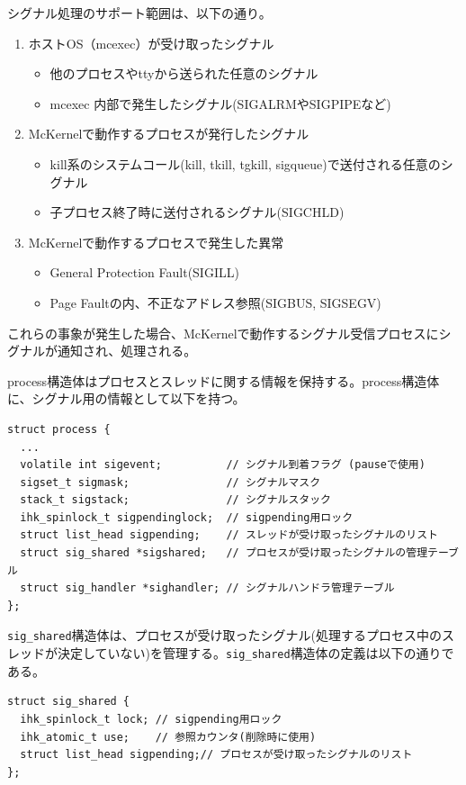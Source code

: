 \documentclass[twoside,11pt,fleqn]{book}
\newcounter{subsubsubsection}[subsubsection]
\begin{document}
{シグナル処理のサポート範囲は、以下の通り。
\begin{enumerate}
\item ホストOS（mcexec）が受け取ったシグナル
\begin{itemize}
\item 他のプロセスやttyから送られた任意のシグナル
\item mcexec 内部で発生したシグナル(SIGALRMやSIGPIPEなど)
\end{itemize}
\item McKernelで動作するプロセスが発行したシグナル
\begin{itemize}
\item kill系のシステムコール(kill, tkill, tgkill, sigqueue)で送付される任意のシグナル
\item 子プロセス終了時に送付されるシグナル(SIGCHLD)
\end{itemize}
\item McKernelで動作するプロセスで発生した異常
\begin{itemize}
\item General Protection Fault(SIGILL)
\item Page Faultの内、不正なアドレス参照(SIGBUS, SIGSEGV)
\end{itemize}
\end{enumerate}
これらの事象が発生した場合、McKernelで動作するシグナル受信プロセスにシグナルが通知され、処理される。


process構造体はプロセスとスレッドに関する情報を保持する。process構造体に、シグナル用の情報として以下を持つ。
\begin{verbatim}
struct process {
  ...
  volatile int sigevent;          // シグナル到着フラグ (pauseで使用)
  sigset_t sigmask;               // シグナルマスク
  stack_t sigstack;               // シグナルスタック
  ihk_spinlock_t sigpendinglock;  // sigpending用ロック
  struct list_head sigpending;    // スレッドが受け取ったシグナルのリスト
  struct sig_shared *sigshared;   // プロセスが受け取ったシグナルの管理テーブル
  struct sig_handler *sighandler; // シグナルハンドラ管理テーブル
};
\end{verbatim}

\texttt{sig\_shared}構造体は、プロセスが受け取ったシグナル(処理するプロセス中のスレッドが決定していない)を管理する。\texttt{sig\_shared}構造体の定義は以下の通りである。
\begin{verbatim}
struct sig_shared {
  ihk_spinlock_t lock; // sigpending用ロック
  ihk_atomic_t use;    // 参照カウンタ(削除時に使用)
  struct list_head sigpending;// プロセスが受け取ったシグナルのリスト
};
\end{verbatim}

}
\end{document}
